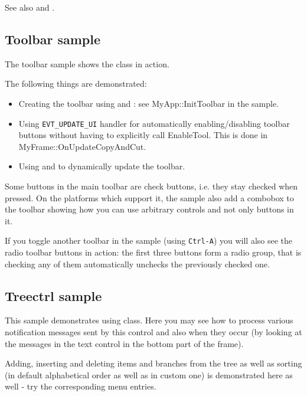 See also  and .

\subsection{Toolbar sample}\label{sampletoolbar}

The toolbar sample shows the  class in action.

The following things are demonstrated:

\begin{itemize}\itemsep=0pt
\item Creating the toolbar using  
and : see
MyApp::InitToolbar in the sample.
\item Using {\tt EVT\_UPDATE\_UI} handler for automatically enabling/disabling
toolbar buttons without having to explicitly call EnableTool. This is done
in MyFrame::OnUpdateCopyAndCut.
\item Using  and 
 to dynamically update the
toolbar.
\end{itemize}

Some buttons in the main toolbar are check buttons, i.e. they stay checked when
pressed. On the platforms which support it, the sample also add a combobox
to the toolbar showing how you can use arbitrary controls and not only buttons
in it.

If you toggle another toolbar in the sample (using {\tt Ctrl-A}) you will also
see the radio toolbar buttons in action: the first three buttons form a radio
group, that is checking any of them automatically unchecks the previously
checked one.

\subsection{Treectrl sample}\label{sampletreectrl}

This sample demonstrates using  class. Here
you may see how to process various notification messages sent by this control
and also when they occur (by looking at the messages in the text control in
the bottom part of the frame).

Adding, inserting and deleting items and branches from the tree as well as
sorting (in default alphabetical order as well as in custom one) is
demonstrated here as well - try the corresponding menu entries.


